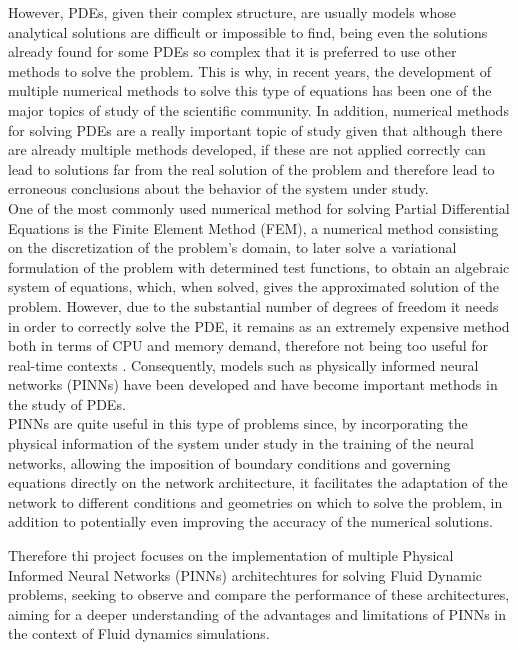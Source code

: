 \documentclass[12pt,letterpaper]{article}
\begin{document}
However, PDEs, given their complex structure, are usually models whose analytical solutions are difficult or impossible to find, being even the solutions already found for some PDEs so complex that it is preferred to use other methods to solve the problem\cite{strauss2007partial}. This is why, in recent years, the development of multiple numerical methods to solve this type of equations has been one of the major topics of study of the scientific community. In addition, numerical methods for solving PDEs are a really important topic of study given that although there are already multiple methods developed, if these are not applied correctly can lead to solutions far from the real solution of the problem and therefore lead to erroneous conclusions about the behavior of the system under study.\\

One of the most commonly used numerical method for solving Partial Differential Equations is the Finite Element Method (FEM), a numerical method consisting on the discretization of the problem's domain, to later solve a variational formulation of the problem with determined test functions, to obtain an algebraic system of equations, which, when solved, gives the approximated solution of the problem. However, due to the substantial number of degrees of freedom it needs in order to correctly solve the PDE, it remains as an extremely expensive method both in terms of CPU and memory demand, therefore not being too useful for real-time contexts\cite{hesthaven2018non} \cite{PINNQuarteroni}. Consequently, models such as physically informed neural networks (PINNs) have been developed and have become important methods in the study of PDEs.\\

PINNs are quite useful in this type of problems since, by incorporating the physical information of the system under study in the training of the neural networks, allowing the imposition of boundary conditions and governing equations directly on the network architecture, it facilitates the adaptation of the network to different conditions and geometries on which to solve the problem, in addition to potentially even improving the accuracy of the numerical solutions.

Therefore thi project focuses on the implementation of multiple Physical Informed Neural Networks (PINNs) architechtures for solving Fluid Dynamic problems, seeking to observe and compare the performance of these architectures, aiming for a deeper understanding of the advantages and limitations of PINNs in the context of Fluid dynamics simulations.
\end{document}
